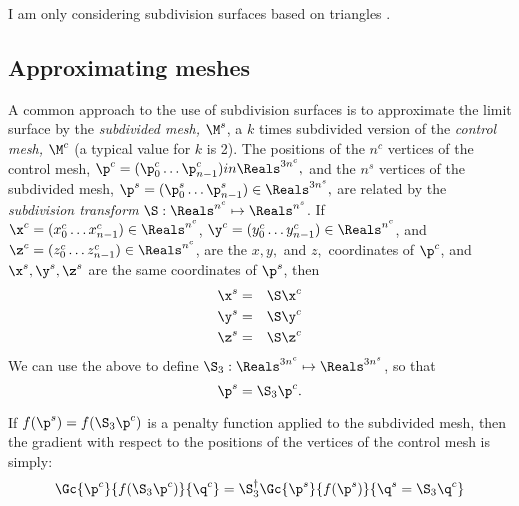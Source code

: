 I am only considering subdivision surfaces based on triangles
\cite{HoppeEtal:1994:SIGGRAPH,Hoppe:1994:Phd}.

\subsection{Approximating meshes}
\label{sec:Approximating-meshes}

A common approach to the use of subdivision surfaces is
to approximate the limit surface by the {\it subdivided mesh,} $\M^s$,
a $k$ times subdivided version of the {\it control mesh,} $\M^c$
(a typical value for $k$ is 2).
The positions of the $n^c$ vertices of the control mesh,
$\p^c = (\p^c_0 \ldots \p^c_{n-1}) \\in \Reals^{3n^c},$
and the $n^s$ vertices of the subdivided mesh,
$\p^s = (\p^s_0 \ldots \p^s_{n-1}) \in \Reals^{3n^s},$
are related by the {\it subdivision transform}
$\S : \Reals^{n^c} \mapsto \Reals^{n^s}$.
If
$\x^c = (x^c_0 \ldots x^c_{n-1}) \in \Reals^{n^c}$,
$\y^c = (y^c_0 \ldots y^c_{n-1}) \in \Reals^{n^c}$,
and
$\z^c = (z^c_0 \ldots z^c_{n-1}) \in \Reals^{n^c}$,
are the $x, y,$ and $z,$ coordinates of $\p^c$,
and $\x^s, \y^s, \z^s$ are the same coordinates
of $\p^s$, then
\begin{eqnarray}
\x^s & = & \S \x^c
\\
\y^s & = & \S \y^c
\nonumber
\\
\z^s & = & \S \z^c
\nonumber
\end{eqnarray}
We can use the above to define $\S_3 : \Reals^{3n^c} \mapsto \Reals^{3n^s}$,
so that
\begin{equation}
\p^s = \S_3 \p^c.
\end{equation}


If $f(\p^s) = f(\S_3 \p^c)$ is a penalty function applied to the subdivided mesh,
then the gradient with respect to the positions of
the vertices of the control mesh is simply:
\begin{equation}
\Gc{\p^c}{f(\S_3 \p^c)}{\q^c} = \S_3^{\dagger} \Gc{\p^s}{f(\p^s)}{\q^s = \S_3 \q^c}
\end{equation}
